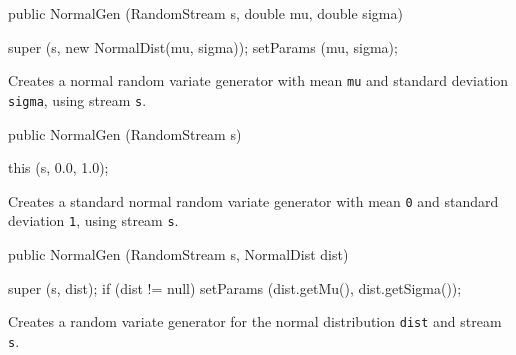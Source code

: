 \begin{code}

   public NormalGen (RandomStream s, double mu, double sigma) \begin{hide} {
      super (s, new NormalDist(mu, sigma));
      setParams (mu, sigma);
   }\end{hide}
\end{code}
\begin{tabb}  Creates a normal random variate generator with mean \texttt{mu}
  and standard deviation \texttt{sigma}, using stream \texttt{s}.
\end{tabb}
\begin{code}

   public NormalGen (RandomStream s) \begin{hide} {
      this (s, 0.0, 1.0);
   }\end{hide}
\end{code}
\begin{tabb}  Creates a standard normal random variate generator with mean
  \texttt{0} and standard deviation \texttt{1}, using stream \texttt{s}.
\end{tabb}
\begin{code}

   public NormalGen (RandomStream s, NormalDist dist) \begin{hide} {
      super (s, dist);
      if (dist != null)
         setParams (dist.getMu(), dist.getSigma());
   }\end{hide}
\end{code}
\begin{tabb} Creates a random variate generator for the normal distribution
  \texttt{dist} and stream \texttt{s}.
\end{tabb}


